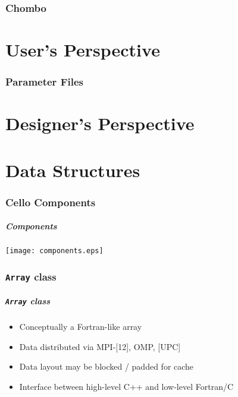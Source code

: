 \documentclass{beamer}
\newcommand{\code}[1]{\texttt{#1}}
\begin{document}
\section{Chombo}

\part{User's Perspective}

\section{Parameter Files}


\part{Designer's Perspective}

\part{Data Structures}

\section{Cello Components}

\begin{frame}
\frametitle{Components}
\centerline{\texttt{[image: components.eps]}}
\end{frame}

\section{\code{Array} class}

\begin{frame}
\frametitle{\code{Array} class}

\begin{itemize}
\item Conceptually a Fortran-like array
\item Data distributed via MPI-[12], OMP, [UPC]
\item Data layout may be blocked / padded for cache
\item Interface between high-level C++ and low-level Fortran/C
\end{itemize}
\end{frame}
\end{document}
